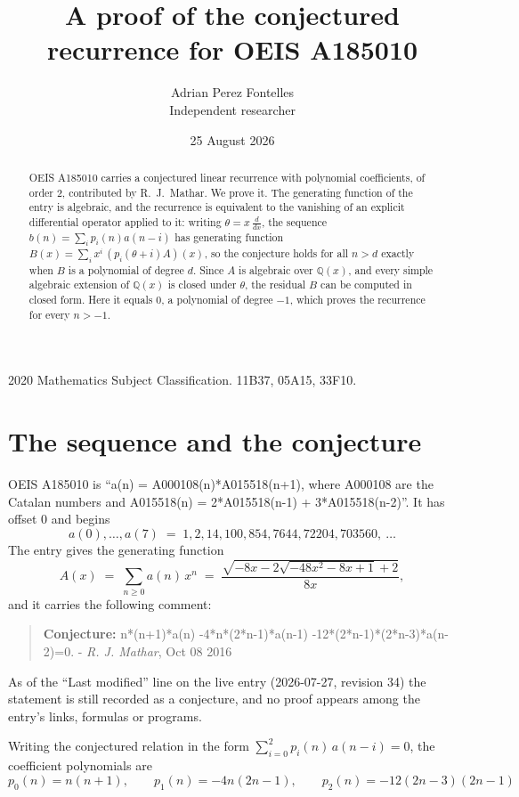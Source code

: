 \documentclass[11pt,a4paper]{article}
\title{A proof of the conjectured recurrence for OEIS A185010}
\author{Adrian Perez Fontelles\\ \small Independent researcher}
\date{25 August 2026}
\theoremstyle{plain}
\theoremstyle{definition}
\begin{document}
\maketitle

\begin{abstract}
OEIS A185010 carries a conjectured linear recurrence with polynomial coefficients, of
order 2, contributed by R.~J.~Mathar. We prove it. The generating function of the
entry is algebraic, and the recurrence is equivalent to the vanishing of an explicit
differential operator applied to it: writing $\theta=x\,\frac{d}{dx}$, the sequence
$b(n)=\sum_{i}p_{i}(n)a(n-i)$ has generating function
$B(x)=\sum_{i}x^{i}\,(p_{i}(\theta+i)A)(x)$, so the conjecture holds for all $n>d$ exactly
when $B$ is a polynomial of degree $d$. Since $A$ is algebraic over $\mathbb{Q}(x)$, and every simple
algebraic extension of $\mathbb{Q}(x)$ is closed under $\theta$, the residual $B$ can be
computed in closed form. Here it equals $0$, a polynomial of degree $-1$, which proves
the recurrence for every $n>-1$.
\end{abstract}

\noindent\small 2020 Mathematics Subject Classification. 11B37, 05A15, 33F10.\normalsize

\section{The sequence and the conjecture}

OEIS A185010 is ``a(n) = A000108(n)*A015518(n+1), where A000108 are the Catalan numbers and A015518(n) = 2*A015518(n-1) + 3*A015518(n-2)''. It has offset $0$ and begins
\[
a(0),\dots,a(7)\;=\;1, 2, 14, 100, 854, 7644, 72204, 703560,\ \dots
\]
The entry gives the generating function
\begin{equation}\label{eq:gf}
A(x)\;=\;\sum_{n\ge 0} a(n)\,x^{n}\;=\;\frac{\sqrt{- 8 x - 2 \sqrt{- 48 x^{2} - 8 x + 1} + 2}}{8 x} ,
\end{equation}
and it carries the following comment:
\begin{quote}\small
\textbf{Conjecture:} n*(n+1)*a(n) -4*n*(2*n-1)*a(n-1) -12*(2*n-1)*(2*n-3)*a(n-2)=0. - \emph{R. J. Mathar}, Oct 08 2016
\end{quote}
As of the ``Last modified'' line on the live entry (2026-07-27, revision 34) the
statement is still recorded as a conjecture, and no proof appears among the entry's links,
formulas or programs.

Writing the conjectured relation in the form $\sum_{i=0}^{2}p_{i}(n)\,a(n-i)=0$,
the coefficient polynomials are
\[
p_{0}(n)=n \left(n + 1\right),\qquad p_{1}(n)=- 4 n \left(2 n - 1\right),\qquad p_{2}(n)=- 12 \left(2 n - 3\right) \left(2 n - 1\right)
\]
\end{document}

